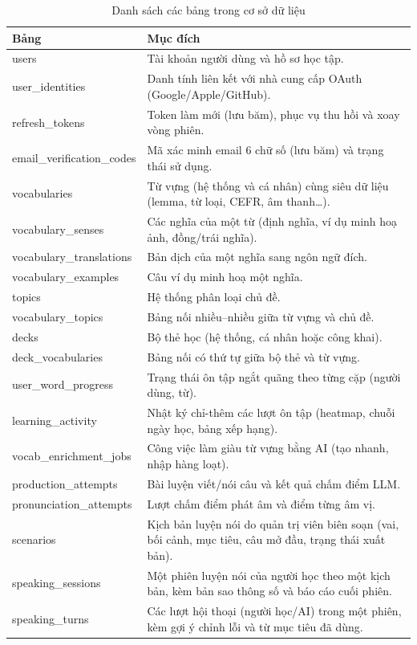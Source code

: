 \begin{table}[h]
  \centering
  \small
  \renewcommand{\arraystretch}{1.3}
  \begin{tabular}{|p{4.0cm}|p{10.6cm}|}
    \hline
    \textbf{Bảng} & \textbf{Mục đích} \\
    \hline
    users & Tài khoản người dùng và hồ sơ học tập. \\
    \hline
    user\_identities & Danh tính liên kết với nhà cung cấp OAuth (Google/Apple/GitHub). \\
    \hline
    refresh\_tokens & Token làm mới (lưu băm), phục vụ thu hồi và xoay vòng phiên. \\
    \hline
    email\_verification\_codes & Mã xác minh email 6 chữ số (lưu băm) và trạng thái sử dụng. \\
    \hline
    vocabularies & Từ vựng (hệ thống và cá nhân) cùng siêu dữ liệu (lemma, từ loại, CEFR, âm thanh\ldots). \\
    \hline
    vocabulary\_senses & Các nghĩa của một từ (định nghĩa, ví dụ minh hoạ ảnh, đồng/trái nghĩa). \\
    \hline
    vocabulary\_translations & Bản dịch của một nghĩa sang ngôn ngữ đích. \\
    \hline
    vocabulary\_examples & Câu ví dụ minh hoạ một nghĩa. \\
    \hline
    topics & Hệ thống phân loại chủ đề. \\
    \hline
    vocabulary\_topics & Bảng nối nhiều--nhiều giữa từ vựng và chủ đề. \\
    \hline
    decks & Bộ thẻ học (hệ thống, cá nhân hoặc công khai). \\
    \hline
    deck\_vocabularies & Bảng nối có thứ tự giữa bộ thẻ và từ vựng. \\
    \hline
    user\_word\_progress & Trạng thái ôn tập ngắt quãng theo từng cặp (người dùng, từ). \\
    \hline
    learning\_activity & Nhật ký chỉ-thêm các lượt ôn tập (heatmap, chuỗi ngày học, bảng xếp hạng). \\
    \hline
    vocab\_enrichment\_jobs & Công việc làm giàu từ vựng bằng AI (tạo nhanh, nhập hàng loạt). \\
    \hline
    production\_attempts & Bài luyện viết/nói câu và kết quả chấm điểm LLM. \\
    \hline
    pronunciation\_attempts & Lượt chấm điểm phát âm và điểm từng âm vị. \\
    \hline
    scenarios & Kịch bản luyện nói do quản trị viên biên soạn (vai, bối cảnh, mục tiêu, câu mở đầu, trạng thái xuất bản). \\
    \hline
    speaking\_sessions & Một phiên luyện nói của người học theo một kịch bản, kèm bản sao thông số và báo cáo cuối phiên. \\
    \hline
    speaking\_turns & Các lượt hội thoại (người học/AI) trong một phiên, kèm gợi ý chỉnh lỗi và từ mục tiêu đã dùng. \\
    \hline
  \end{tabular}
  \caption{Danh sách các bảng trong cơ sở dữ liệu}
  \label{tab:db-overview}
\end{table}

